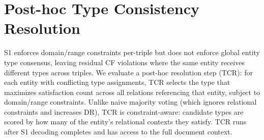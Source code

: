 
\section{Post-hoc Type Consistency Resolution}
\label{app:tcr}

S1 enforces domain/range constraints per-triple but does not enforce global entity type consensus, leaving residual CF violations where the same entity receives different types across triples.
We evaluate a post-hoc resolution step (TCR): for each entity with conflicting type assignments, TCR selects the type that maximizes satisfaction count across all relations referencing that entity, subject to domain/range constraints.
Unlike naive majority voting (which ignores relational constraints and increases DR), TCR is constraint-aware: candidate types are scored by how many of the entity's relational contexts they satisfy.
TCR runs after S1 decoding completes and has access to the full document context.

\begin{table}[h]
\centering
\small
{}
\caption{TCR on SciERC ($\bar{\kappa}{=}0.333$, 551 docs).
Pre/Post: before/after TCR.
$\Delta$E-F1: entity F1 change (F1$\times$100).
Fund.: percentage of conflicting entities where no single type satisfies all relational constraints (fundamental conflicts).
TCR eliminates all CF with DR increases $\leq$0.28\,pp; fundamental conflicts are 0--2\%.}
\label{tab:tcr-scierc}
\end{table}


